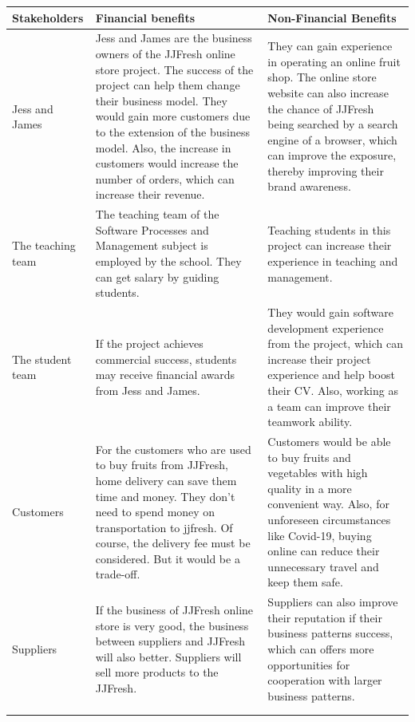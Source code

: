 \documentclass{report}
\begin{document}
\begin{tabularx}{0.95\linewidth}{%
  >{\raggedright\arraybackslash}l%
  >{\raggedright\arraybackslash}X%
  >{\raggedright\arraybackslash}X}
  \toprule
  Stakeholders & Financial benefits & Non-Financial Benefits \\
  \midrule
  Jess and James
  & Jess and James are the business owners of the JJFresh online store project. The success of the project can help them change their business model. They would gain more customers due to the extension of the business model. Also, the increase in customers would increase the number of orders, which can increase their revenue.
  & They can gain experience in operating an online fruit shop. The online store website can also increase the chance of JJFresh being searched by a search engine of a browser, which can improve the exposure, thereby improving their brand awareness. 
  \\
  \midrule
  The teaching team
  & The teaching team of the Software Processes and Management subject is employed by the school. They can get salary by guiding students.
  & Teaching students in this project can increase their experience in teaching and management.
  \\
  \midrule
  The student team
  & If the project achieves commercial success, students may receive financial awards from Jess and James.
  & They would gain software development experience from the project, which can increase their project experience and help boost their CV. Also, working as a team can improve their teamwork ability.
  \\
  \midrule
  Customers
  & For the customers who are used to buy fruits from JJFresh, home delivery can save them time and money. They don't need to spend money on transportation to jjfresh. Of course, the delivery fee must be considered. But it would be a trade-off.
  & Customers would be able to buy fruits and vegetables with high quality in a more convenient way. Also, for unforeseen circumstances like Covid-19, buying online can reduce their unnecessary travel and keep them safe.
  \\
  \midrule
  Suppliers
  & If the business of JJFresh online store is very good, the business between suppliers and JJFresh will also better. Suppliers will sell more products to the JJFresh.
  & Suppliers can also improve their reputation if their business patterns success, which can offers more opportunities for cooperation with larger business patterns.
  \\
  \bottomrule
  \\
  \caption{Business Value}  
  \label{tab:businessValue}
\end{tabularx}
\end{document}
